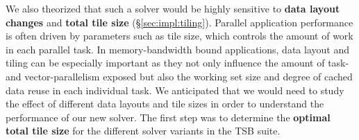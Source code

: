 \documentclass{sig-alternate}
\begin{document}
We also theorized that such a solver would be highly sensitive to
  \textbf{data layout changes} and
  \textbf{total tile size} (\S\ref{sec:impl:tiling}).
Parallel application performance is often driven by parameters such as 
  tile size, which controls the amount of work in each parallel task.
In memory-bandwidth bound applications, data layout and tiling can be
  especially important as they not only influence the amount of task- and
  vector-parallelism exposed but also the working set size and degree of cached
  data reuse in each individual task.
We anticipated that we would need to study the effect of different data layouts
  and tile sizes in order to understand the performance of our new solver.
The first step was to determine the \textbf{optimal total tile size} for the 
  different solver variants in the TSB suite.
\end{document}
